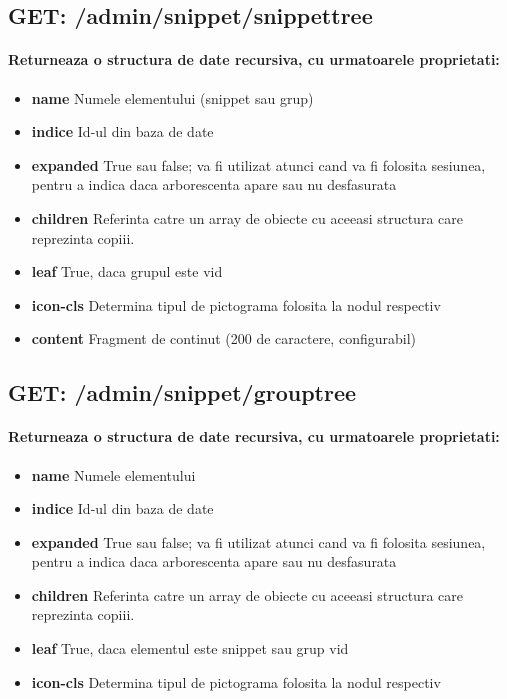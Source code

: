  \subsection*{GET: /admin/snippet/snippettree}

\paragraph{Returneaza o structura de date recursiva, cu urmatoarele proprietati:}
\begin{itemize}
\item \textbf{name}
 Numele elementului (snippet sau grup)
\item \textbf{indice}
 Id-ul din baza de date
\item \textbf{expanded}
 True sau false; va fi utilizat atunci cand va fi folosita sesiunea, pentru a indica daca arborescenta apare sau nu desfasurata 
\item \textbf{children}
 Referinta catre un array de obiecte cu aceeasi structura care reprezinta copiii.
\item \textbf{leaf}
 True, daca grupul este vid
\item \textbf{icon-cls}
 Determina tipul de pictograma folosita la nodul respectiv
\item \textbf{content}
 Fragment de continut (200 de caractere, configurabil)
 \end{itemize}
 \subsection*{GET: /admin/snippet/grouptree}

\paragraph{Returneaza o structura de date recursiva, cu urmatoarele proprietati:}
\begin{itemize}
\item \textbf{name}
 Numele elementului
\item \textbf{indice}
 Id-ul din baza de date
\item \textbf{expanded}
 True sau false; va fi utilizat atunci cand va fi folosita sesiunea, pentru a indica daca arborescenta apare sau nu desfasurata 
\item \textbf{children}
 Referinta catre un array de obiecte cu aceeasi structura care reprezinta copiii.
\item \textbf{leaf}
 True, daca elementul este snippet sau grup vid
\item \textbf{icon-cls}
 Determina tipul de pictograma folosita la nodul respectiv
 \end{itemize}

